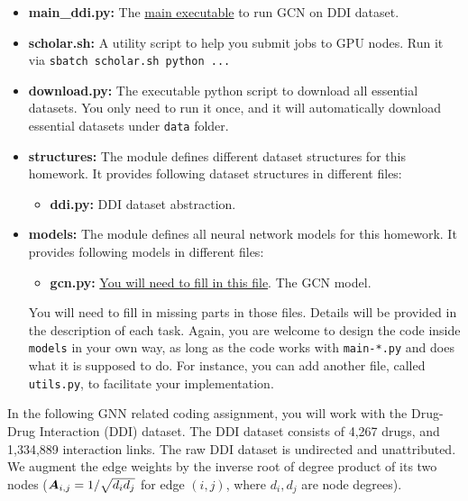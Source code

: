 \begin{itemize}
\item
    \textbf{main\_ddi.py:}
    The \underline{main executable} to run GCN on DDI dataset.
\item
    \textbf{scholar.sh:}
    A utility script to help you submit jobs to GPU nodes. Run it via \texttt{sbatch scholar.sh python ...}
%
\item
    \textbf{download.py:}
    The executable python script to download all essential datasets.
    You only need to run it once, and it will automatically download essential
    datasets under \texttt{data} folder.
%
\item
    \textbf{structures:}
    The module defines different dataset structures for this homework.
    It provides following dataset structures in different files:
    \begin{itemize}
    \item
        \textbf{ddi.py:} DDI dataset abstraction.
    \end{itemize}
%
\item
    \textbf{models:}
    The module defines all neural network models for this homework.
    It provides following models in different files:
    \begin{itemize}
    \item
        \textbf{gcn.py:} \underline{You will need to fill in this file}. The GCN model.
    \end{itemize}
    You will need to fill in missing parts in those files.
    Details will be provided in the description of each task.
    Again, you are welcome to design the code inside \texttt{models} in your
    own way, as long as the code works with \texttt{main-*.py} and does what it is supposed to do.
    For instance, you can add another file, called \texttt{utils.py}, to
    facilitate your implementation.
%
\end{itemize}

%

%
In the following GNN related coding assignment, you will work with the
Drug-Drug Interaction (DDI) dataset.
%
The DDI dataset consists of 4,267 drugs, and 1,334,889 interaction links.
%
The raw DDI dataset is undirected and unattributed.
%
We augment the edge weights by the inverse root of degree product of its two
nodes ($\bm{A}_{i, j} = 1 / \sqrt{d_{i} d_{j}}$ for edge $(i, j)$, where $d_{i},
d_{j}$ are node degrees).

